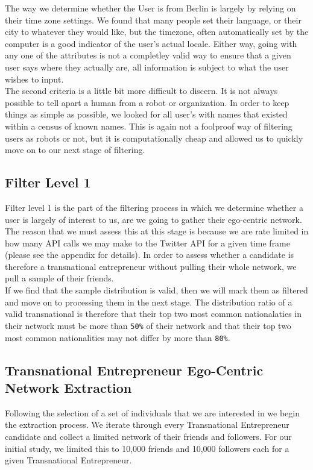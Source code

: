 The way we determine whether the User is from Berlin is largely by relying on their time zone settings. We found that many people set their language, or their city to whatever they would like, but the timezone, often automatically set by the computer is a good indicator of the user's actual locale. Either way, going with any one of the attributes is not a completley valid way to ensure that a given user says where they actually are, all information is subject to what the user wishes to input.
\\
The second criteria is a little bit more difficult to discern. It is not always possible to tell apart a human from a robot or organization. In order to keep things as simple as possible, we looked for all user's with names that existed within a census of known names. This is again not a foolproof way of filtering users as robots or not, but it is computationally cheap and allowed us to quickly move on to our next stage of filtering.

\subsection{Filter Level 1}
Filter level 1 is the part of the filtering process in which we determine whether a user is largely of interest to us, are we going to gather their ego-centric network. The reason that we must assess this at this stage is because we are rate limited in how many API calls we may make to the Twitter API for a given time frame (please see the appendix for details). In order to assess whether a candidate is therefore a transnational entrepreneur without pulling their whole network, we pull a sample of their friends.
\\
If we find that the sample distribution is valid, then we will mark them as filtered and move on to processing them in the next stage. The distribution ratio of a valid transnational is therefore that their top two most common nationalaties in their network must be more than \verb|50%| of their network and that their top two most common nationalities may not differ by more than \verb|80%|.

\subsection{Transnational Entrepreneur Ego-Centric Network Extraction}
Following the selection of a set of individuals that we are interested in we begin the extraction process. We iterate through every Transnational Entrepreneur candidate and collect a limited network of their friends and followers. For our initial study, we limited this to 10,000 friends and 10,000 followers each for a given Transnational Entrepreneur.

